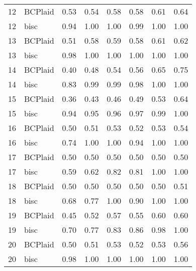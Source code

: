 \begin{table}[ht]
\begin{tabular}{rlrrrrrr}
   12 & BCPlaid & 0.53 & 0.54 & 0.58 & 0.58 & 0.61 & 0.64 \\ 
   12 & bisc & 0.94 & 1.00 & 1.00 & 0.99 & 1.00 & 1.00 \\ 
   13 & BCPlaid & 0.51 & 0.58 & 0.59 & 0.58 & 0.61 & 0.62 \\ 
   13 & bisc & 0.98 & 1.00 & 1.00 & 1.00 & 1.00 & 1.00 \\ 
   14 & BCPlaid & 0.40 & 0.48 & 0.54 & 0.56 & 0.65 & 0.75 \\ 
   14 & bisc & 0.83 & 0.99 & 0.99 & 0.98 & 1.00 & 1.00 \\ 
   15 & BCPlaid & 0.36 & 0.43 & 0.46 & 0.49 & 0.53 & 0.64 \\ 
   15 & bisc & 0.94 & 0.95 & 0.96 & 0.97 & 0.99 & 1.00 \\ 
   16 & BCPlaid & 0.50 & 0.51 & 0.53 & 0.52 & 0.53 & 0.54 \\ 
   16 & bisc & 0.74 & 1.00 & 1.00 & 0.94 & 1.00 & 1.00 \\ 
   17 & BCPlaid & 0.50 & 0.50 & 0.50 & 0.50 & 0.50 & 0.50 \\ 
   17 & bisc & 0.59 & 0.62 & 0.82 & 0.81 & 1.00 & 1.00 \\ 
   18 & BCPlaid & 0.50 & 0.50 & 0.50 & 0.50 & 0.50 & 0.51 \\ 
   18 & bisc & 0.68 & 0.77 & 1.00 & 0.90 & 1.00 & 1.00 \\ 
   19 & BCPlaid & 0.45 & 0.52 & 0.57 & 0.55 & 0.60 & 0.60 \\ 
   19 & bisc & 0.70 & 0.77 & 0.83 & 0.86 & 0.98 & 1.00 \\ 
   20 & BCPlaid & 0.50 & 0.51 & 0.53 & 0.52 & 0.53 & 0.56 \\ 
   20 & bisc & 0.98 & 1.00 & 1.00 & 1.00 & 1.00 & 1.00 \\ 
   \bottomrule
\end{tabular}
\end{table}
